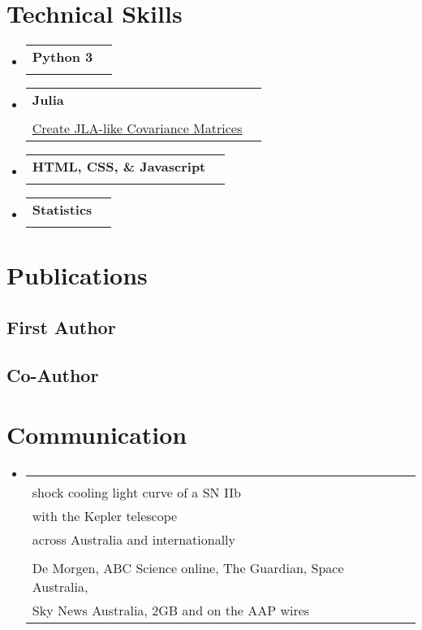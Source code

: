 \documentclass[letterpaper,11pt]{article}
\makeatletter
\newcommand{\resumeItem}[1]{
  \item\small{
    {#1 \vspace{-2pt}}
  }
}
\newcommand{\resumeSubheading}[4]{
  \vspace{-2pt}\item
    \begin{tabular*}{0.97\textwidth}[t]{l@{\extracolsep{\fill}}r}
      \textbf{#1} & #2 \\
      \textit{\small#3} & \textit{\small #4} \\
    \end{tabular*}\vspace{-7pt}
}
\newcommand{\resumeSubHeadingListStart}{\begin{itemize}[leftmargin=0.15in, label={}]}
\newcommand{\resumeSubHeadingListEnd}{\end{itemize}}
\newcommand{\resumeItemListStart}{\begin{itemize}}
\newcommand{\resumeItemListEnd}{\end{itemize}\vspace{-5pt}}
\newcommand{\communicationElement}[5]{%
    \resumeSubHeadingListStart
        \resumeSubheading
            {\makecell[l]{#1}}
            {\makecell[r]{#2}}
            {\makecell[l]{#3}}
            {\makecell[r]{#4}}
            \ifthenelse{\isempty{#5}}{}{%
                \resumeItemListStart
                    \renewcommand*{\do}[1]{\resumeItem{##1}}
                    \docsvlist{#5}%
                \resumeItemListEnd
            }%
    \resumeSubHeadingListEnd
}
\newcommand{\proficiencyElement}[5]{%
    \resumeSubHeadingListStart
        \resumeSubheading
            {#1}
            {#2}
            {\makecell[l]{#3}}
            {#4}
            {#5}
    \resumeSubHeadingListEnd
}
\makeatother
\begin{document}
\section{Technical Skills}

    \proficiencyElement{Python 3}{}{Example Projects: \href{https://github.com/dessn/Pippin}{\underline{Pippin Pipeline}}, \href{https://github.com/dessn/BiasValidation}{\underline{Approximate Neyman Construction Cosmology Validator}}}{}{}
    \proficiencyElement{Julia}{}{Example Projects: \href{https://github.com/OmegaLambda1998/ShockCooling.jl}{\underline{Fit Type II Shock Cooling Lightcurves}}, \href{https://github.com/OmegaLambda1998/SALTJacobian.jl}{\underline{Approximate SALT2/3 Simulations}},\\\phantom{\hbox{Example Projects: }}\href{https://github.com/OmegaLambda1998/JLACovarianceMatrix.jl}{\underline{Create JLA-like Covariance Matrices}}}{}{}
    \proficiencyElement{HTML, CSS, \& Javascript}{}{Example Projects: \href{https://www.mso.anu.edu.au/debass/}{\underline{DEBass Survey}}, \href{https://www.omegalambda.au/}{\underline{Personal Website}}}{}{}
    \proficiencyElement{Statistics}{}{MCMC, ABC, and other Bayesian Inference, Frequentist Inference, Data Analysis, Data Visualisation}{}{}


\section{Publications}

    \subsection{First Author}

    \subsection{Co-Author}

\section{Communication}

    \communicationElement{SN2017jgh: a high-cadence complete\\shock cooling light curve of a SN IIb\\with the Kepler telescope}{Over 180 items in print, radio, and online,\\across Australia and internationally}{\textbf{Highlights:}, Al Jazeera, National Geographic Indonesia, Radio Canada,\\De Morgen, ABC Science online, The Guardian, Space Australia,\\Sky News Australia, 2GB and on the AAP wires}{2021}{}
\end{document}
